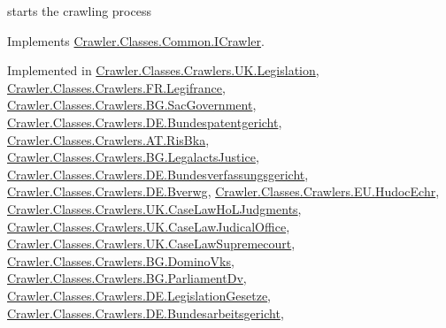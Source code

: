 starts the crawling process 



Implements \hyperlink{interface_crawler_1_1_classes_1_1_common_1_1_i_crawler_a5fabe437ecf6f494c75d6c79487b63ab}{Crawler.\-Classes.\-Common.\-I\-Crawler}.



Implemented in \hyperlink{class_crawler_1_1_classes_1_1_crawlers_1_1_u_k_1_1_legislation_a09e9b181965e055ef411760f328f7599}{Crawler.\-Classes.\-Crawlers.\-U\-K.\-Legislation}, \hyperlink{class_crawler_1_1_classes_1_1_crawlers_1_1_f_r_1_1_legifrance_a3d1a250e24dd357558ee282670ec601b}{Crawler.\-Classes.\-Crawlers.\-F\-R.\-Legifrance}, \hyperlink{class_crawler_1_1_classes_1_1_crawlers_1_1_b_g_1_1_sac_government_a2ae15cb53f987fbdf4643b5937fa8cb2}{Crawler.\-Classes.\-Crawlers.\-B\-G.\-Sac\-Government}, \hyperlink{class_crawler_1_1_classes_1_1_crawlers_1_1_d_e_1_1_bundespatentgericht_a7185d1aecf109bfa9b34b7a66525e7b9}{Crawler.\-Classes.\-Crawlers.\-D\-E.\-Bundespatentgericht}, \hyperlink{class_crawler_1_1_classes_1_1_crawlers_1_1_a_t_1_1_ris_bka_a5ea8a638fe0a890b318cd9af4bc7d929}{Crawler.\-Classes.\-Crawlers.\-A\-T.\-Ris\-Bka}, \hyperlink{class_crawler_1_1_classes_1_1_crawlers_1_1_b_g_1_1_legalacts_justice_a68a8a4170fda98eeba5db7672a44ff2c}{Crawler.\-Classes.\-Crawlers.\-B\-G.\-Legalacts\-Justice}, \hyperlink{class_crawler_1_1_classes_1_1_crawlers_1_1_d_e_1_1_bundesverfassungsgericht_a27afd53b86cc443076a2efd8df3c2078}{Crawler.\-Classes.\-Crawlers.\-D\-E.\-Bundesverfassungsgericht}, \hyperlink{class_crawler_1_1_classes_1_1_crawlers_1_1_d_e_1_1_bverwg_aeae6653df84bcb361985ff11a64d50ae}{Crawler.\-Classes.\-Crawlers.\-D\-E.\-Bverwg}, \hyperlink{class_crawler_1_1_classes_1_1_crawlers_1_1_e_u_1_1_hudoc_echr_ab6245fbeeef27910776856916153dee2}{Crawler.\-Classes.\-Crawlers.\-E\-U.\-Hudoc\-Echr}, \hyperlink{class_crawler_1_1_classes_1_1_crawlers_1_1_u_k_1_1_case_law_ho_l_judgments_ad73a34652655a6a9891dc78e4f76265b}{Crawler.\-Classes.\-Crawlers.\-U\-K.\-Case\-Law\-Ho\-L\-Judgments}, \hyperlink{class_crawler_1_1_classes_1_1_crawlers_1_1_u_k_1_1_case_law_judical_office_adac917a75514264a01911cbf5476807a}{Crawler.\-Classes.\-Crawlers.\-U\-K.\-Case\-Law\-Judical\-Office}, \hyperlink{class_crawler_1_1_classes_1_1_crawlers_1_1_u_k_1_1_case_law_supremecourt_adb1a283c34de4cec5c098ba8978e5a3d}{Crawler.\-Classes.\-Crawlers.\-U\-K.\-Case\-Law\-Supremecourt}, \hyperlink{class_crawler_1_1_classes_1_1_crawlers_1_1_b_g_1_1_domino_vks_a0de93e8fa14dd68a0698b5e8530e2592}{Crawler.\-Classes.\-Crawlers.\-B\-G.\-Domino\-Vks}, \hyperlink{class_crawler_1_1_classes_1_1_crawlers_1_1_b_g_1_1_parliament_dv_a914bcf46a831a2d4e7e71362a5f8ed1c}{Crawler.\-Classes.\-Crawlers.\-B\-G.\-Parliament\-Dv}, \hyperlink{class_crawler_1_1_classes_1_1_crawlers_1_1_d_e_1_1_legislation_gesetze_ac4bfb29a94183afb5041949aad71d69e}{Crawler.\-Classes.\-Crawlers.\-D\-E.\-Legislation\-Gesetze}, \hyperlink{class_crawler_1_1_classes_1_1_crawlers_1_1_d_e_1_1_bundesarbeitsgericht_a3f0b91fd367fac005e6f3f11148e2e41}{Crawler.\-Classes.\-Crawlers.\-D\-E.\-Bundesarbeitsgericht}, 